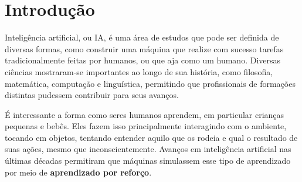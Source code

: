 
\chapter{Introdução}
\label{cap:introducao}

Inteligência artificial, ou IA, é uma área de estudos que pode ser definida de diversas formas, como construir uma máquina que realize com sucesso tarefas tradicionalmente feitas por humanos, ou que aja como um humano.
Diversas ciências mostraram-se importantes ao longo de sua história, como filosofia, matemática, computação e linguística, permitindo que profissionais de formações distintas pudessem contribuir para seus avanços.

É interessante a forma como seres humanos aprendem, em particular crianças pequenas e bebês.
Eles fazem isso principalmente interagindo com o ambiente, tocando em objetos, tentando entender aquilo que os rodeia e qual o resultado de suas ações, mesmo que inconscientemente.
Avanços em inteligência artificial nas últimas décadas permitiram que máquinas simulassem esse tipo de aprendizado por meio de \textbf{aprendizado por reforço}.

